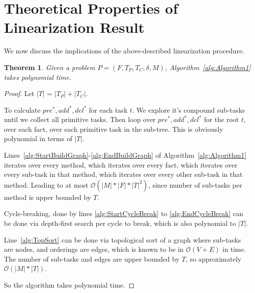 \documentclass[letterpaper]{article} %
\newtheorem{theorem}{Theorem}
\newcommand{\PreS} {\ensuremath{\mathit{pre^{*}}}}
\newcommand{\AddS} {\ensuremath{\mathit{add^{*}}}}
\newcommand{\DelS} {\ensuremath{\mathit{del^{*}}}}
\begin{document}
\section{Theoretical Properties of Linearization Result}

We now discuss the implications of the above-described linearization procedure.

\begin{theorem}\label{thm:Runtime}
	Given a problem $P = (F, T_P, T_C, \delta, M)$, Algorithm~\ref{alg:Algorithm1} takes polynomial time.
\end{theorem}
\begin{proof}  %
	Let $|T|$ = $|T_P| + |T_C|$.
	
	
	
	To calculate $\PreS, \AddS, \DelS$ for each task $t$. We explore it's compound sub-tasks until we collect all primitive tasks. Then loop over $\PreS, \AddS, \DelS$ for the root $t$, over each fact, over each primitive task in the sub-tree. This is obviously polynomial in terms of $|T|$. %
	
	Lines~\ref{alg:StartBuildGraph}-\ref{alg:EndBuildGraph} of Algorithm~\ref{alg:Algorithm1} iterates over every method, which iterates over every fact, which iterates over every sub-task in that method, which iterates over every other sub-task in that method. Leading to at most $\mathcal{O}(|M| * |F| * |T|^2)$, since number of sub-tasks per method is upper bounded by $T$.
	
	Cycle-breaking, done by lines \ref{alg:StartCycleBreak} to \ref{alg:EndCycleBreak} can be done via depth-first search per cycle to break, which is also polynomial to $|T|$.
	
	Line~\ref{alg:TopSort} can be done via topological sort of a graph where sub-tasks are nodes, and orderings are edges, which is known to be in $\mathcal{O}(V+E)$ in time. %
	The number of sub-tasks and edges are upper bounded by $T$, so approximately $\mathcal{O}(|M| * |T|)$.
	
	So the algorithm takes polynomial time.
\end{proof}
\end{document}

